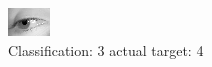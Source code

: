 \begin{figure}[h!]
\begin{center}
\includegraphics[width=0.60\columnwidth]{figures/ID2932_class_3_target_4.png}
\end{center}
\caption{ Classification: 3 actual target: 4}
\label{fig:ID2932_class_3_target_4}
\end{figure}
